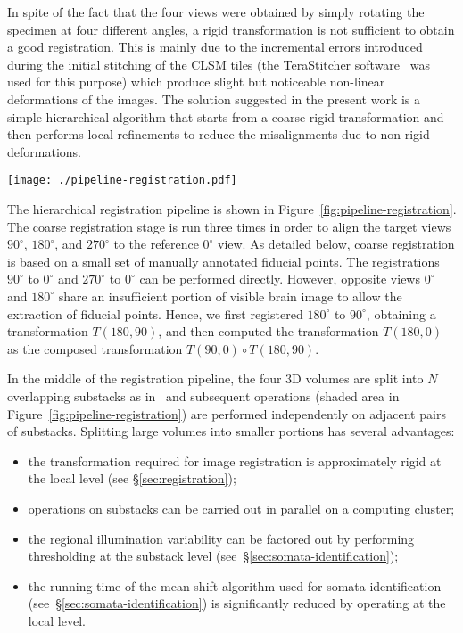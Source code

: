 \documentclass[smallextended]{svjour3}       %
\begin{document}
In spite of the fact that the four views were obtained by simply
rotating the specimen at four different angles, a rigid transformation
is not sufficient to obtain a good registration. This is mainly due to
the incremental errors introduced during the initial stitching of the
CLSM tiles (the TeraStitcher software~\cite{bria_terastitcher-tool_2011} was
used for this purpose) which produce slight but noticeable non-linear
deformations of the images. The solution suggested in the present work
is a simple hierarchical algorithm that starts from a coarse rigid
transformation and then performs local refinements to reduce
the misalignments due to non-rigid deformations.
\begin{figure*}
  \centering
  \texttt{[image: ./pipeline-registration.pdf]}
  \caption{Registration pipeline. The inputs are four stitched volumes
    from orthogonal views.  $T(a,b)$ are the coarse transformations
    mapping from view $a$ to view $b$.  The shaded box is executed in
    parallel for all substacks. At the end, four paired sets of
    substacks associated with adjacent views are produced.}
  \label{fig:pipeline-registration}
\end{figure*}
The hierarchical registration pipeline is shown
in Figure~\ref{fig:pipeline-registration}.
The coarse registration stage is run three times in order to align the
target views $90^\circ$, $180^\circ$, and $270^\circ$ to the reference
$0^\circ$ view. As detailed below, coarse registration is based on a
small set of manually annotated fiducial points. The registrations
$90^\circ$ to $0^\circ$ and $270^\circ$ to $0^\circ$ can be performed
directly. However, opposite views $0^\circ$ and $180^\circ$ share an
insufficient portion of visible brain image to allow the extraction of
fiducial points. Hence, we first registered $180^\circ$ to $90^\circ$,
obtaining a transformation $T(180,90)$, and then computed the
transformation $T(180,0)$ as the composed transformation
$T(90,0) \circ T(180,90)$. %

In the middle of the registration pipeline, the four 3D volumes are
split into $N$ overlapping substacks as
in~\cite{frasconi_large-scale_2014} and subsequent operations (shaded
area in Figure~\ref{fig:pipeline-registration}) are performed
independently on adjacent pairs of substacks. Splitting large volumes
into smaller portions has several advantages:
\begin{itemize}
\item the transformation required for image registration is
  approximately rigid at the local level (see
  \S\ref{sec:registration});
\item operations on substacks can be carried out in parallel on a
  computing cluster;
\item the regional illumination variability can be factored out by
  performing thresholding at the substack level
  (see~\S\ref{sec:somata-identification});
\item the running time of the mean shift algorithm used for somata
  identification (see~\S\ref{sec:somata-identification}) is
  significantly reduced by operating at the local level.
\end{itemize}
\end{document}
